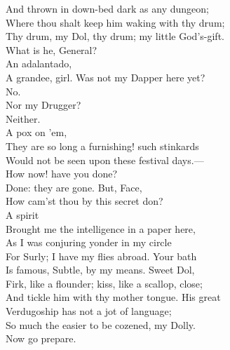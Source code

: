 \documentclass[a4paper,oneside,12pt]{memoir}
\begin{document}
\begin{drama*}
And thrown in down-bed dark as any dungeon;\\
Where thou shalt keep him waking with thy drum;\\
Thy drum, my Dol, thy drum; my little God's-gift.\\
\dolspeaks What is he, General?\\
\facespeaks {} An adalantado,\\
A grandee, girl. Was not my Dapper here yet?\\
\dolspeaks No.\\
\facespeaks {} Nor my Drugger?\\
\dolspeaks {} Neither.\\
\facespeaks {} A pox on 'em,\\
They are so long a furnishing! such stinkards\\
Would not be seen upon these festival days.---\\
How now! have you done?\\
\subtlespeaks {} Done: they are gone. But, Face,\\
How cam'st thou by this secret don?\\
\facespeaks {} A spirit\\
Brought me the intelligence in a paper here,\\
As I was conjuring yonder in my circle\\
For Surly; I have my flies abroad. Your bath\\
Is famous, Subtle, by my means. Sweet Dol,\\
Firk, like a flounder; kiss, like a scallop, close;\\
And tickle him with thy mother tongue. His great\\
Verdugoship has not a jot of language;\\
So much the easier to be cozened, my Dolly.\\
Now go prepare.

\scene


\end{drama*}
\end{document}
